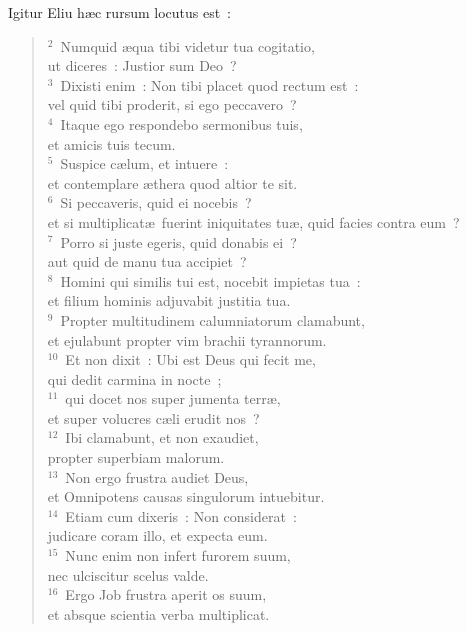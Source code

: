 \lettrine[lines=10,image=true,loversize=0.05,lraise=-0.03]{I}{}gitur Eliu h\ae c rursum locutus est~:
\begin{flushleft}\begin{verse}\vspace{6pt}${}^{2}$~Numquid \ae qua tibi videtur tua cogitatio,\\ ut diceres~: Justior sum Deo~?\\
${}^{3}$~Dixisti enim~: Non tibi placet quod rectum est~:\\ vel quid tibi proderit, si ego peccavero~?\\
${}^{4}$~Itaque ego respondebo sermonibus tuis,\\ et amicis tuis tecum.\\
${}^{5}$~Suspice c\ae lum, et intuere~:\\ et contemplare \ae thera quod altior te sit.\\
${}^{6}$~Si peccaveris, quid ei nocebis~?\\ et si multiplicat\ae\ fuerint iniquitates tu\ae , quid facies contra eum~?\\
${}^{7}$~Porro si juste egeris, quid donabis ei~?\\ aut quid de manu tua accipiet~?\\
${}^{8}$~Homini qui similis tui est, nocebit impietas tua~:\\ et filium hominis adjuvabit justitia tua.\\
${}^{9}$~Propter multitudinem calumniatorum clamabunt,\\ et ejulabunt propter vim brachii tyrannorum.\\
${}^{10}$~Et non dixit~: Ubi est Deus qui fecit me,\\ qui dedit carmina in nocte~;\\
${}^{11}$~qui docet nos super jumenta terr\ae ,\\ et super volucres c\ae li erudit nos~?\\
${}^{12}$~Ibi clamabunt, et non exaudiet,\\ propter superbiam malorum.\\
${}^{13}$~Non ergo frustra audiet Deus,\\ et Omnipotens causas singulorum intuebitur.\\
${}^{14}$~Etiam cum dixeris~: Non considerat~:\\ judicare coram illo, et expecta eum.\\
${}^{15}$~Nunc enim non infert furorem suum,\\ nec ulciscitur scelus valde.\\
${}^{16}$~Ergo Job frustra aperit os suum,\\ et absque scientia verba multiplicat.\end{verse}\end{flushleft}




